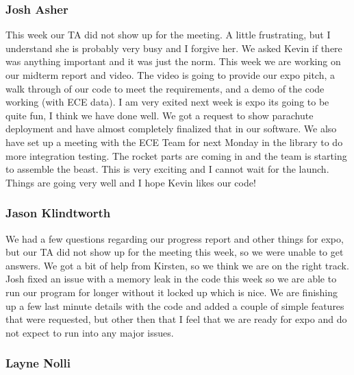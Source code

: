 \documentclass[10pt,draftclsnofoot,onecolumn]{IEEEtran}
\begin{document}
\subsubsection{Josh Asher}
This week our TA did not show up for the meeting. A little frustrating, but I understand she is probably very busy and I forgive her. We asked Kevin if there was anything important and it was just the norm. This week we are working on our midterm report and video. The video is going to provide our expo pitch, a walk through of our code to meet the requirements, and a demo of the code working (with ECE data). I am very exited next week is expo its going to be quite fun, I think we have done well. We got a request to show parachute deployment and have almost completely finalized that in our software. We also have set up a meeting with the ECE Team for next Monday in the library to do more integration testing. The rocket parts are coming in and the team is starting to assemble the beast. This is very exciting and I cannot wait for the launch. Things are going very well and I hope Kevin likes our code! \par

\subsubsection{Jason Klindtworth}
We had a few questions regarding our progress report and other things for expo, but our TA did not show up for the meeting this week, so we were unable to get answers. We got a bit of help from Kirsten, so we think we are on the right track. Josh fixed an issue with a memory leak in the code this week so we are able to run our program for longer without it locked up which is nice. We are finishing up a few last minute details with the code and added a couple of simple features that were requested, but other then that I feel that we are ready for expo and do not expect to run into any major issues. \par

\subsubsection{Layne Nolli}
\end{document}
